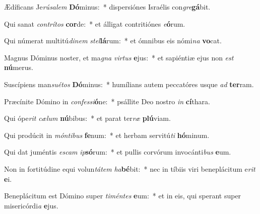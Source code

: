 \item Ædíficans Je\textit{rú}\textit{sa}\textit{lem} \textbf{Dó}minus:~* dispersiónes Israélis con\textit{gre}\textbf{gá}bit.
\item Qui sanat \textit{con}\textit{trí}\textit{tos} \textbf{cor}de:~* et álligat contritiónes \textit{e}\textbf{ó}rum.
\item Qui númerat multitú\textit{di}\textit{nem} \textit{stel}\textbf{lá}rum:~* et ómnibus eis nómi\textit{na} \textbf{vo}cat.
\item Magnus Dóminus noster, et ma\textit{gna} \textit{vir}\textit{tus} \textbf{e}jus:~* et sapiéntiæ ejus non \textit{est} \textbf{nú}merus.
\item Suscípiens man\textit{su}\textit{é}\textit{tos} \textbf{Dó}minus:~* humílians autem peccatóres usque \textit{ad} \textbf{ter}ram.
\item Præcínite Dómino in \textit{con}\textit{fes}\textit{si}\textbf{ó}ne:~* psállite Deo nostro \textit{in} \textbf{cí}thara.
\item Qui ópe\textit{rit} \textit{cæ}\textit{lum} \textbf{nú}bibus:~* et parat ter\textit{ræ} \textbf{plú}viam.
\item Qui prodúcit in \textit{món}\textit{ti}\textit{bus} \textbf{fe}num:~* et herbam servitú\textit{ti} \textbf{hó}minum.
\item Qui dat juméntis \textit{es}\textit{cam} \textit{ip}\textbf{só}rum:~* et pullis corvórum invocánti\textit{bus} \textbf{e}um.
\item Non in fortitúdine equi volun\textit{tá}\textit{tem} \textit{ha}\textbf{bé}bit:~* nec in tíbiis viri beneplácitum e\textit{rit} \textbf{e}i.
\item Beneplácitum est Dómino super \textit{ti}\textit{mén}\textit{tes} \textbf{e}um:~* et in eis, qui sperant super misericórdi\textit{a} \textbf{e}jus.
